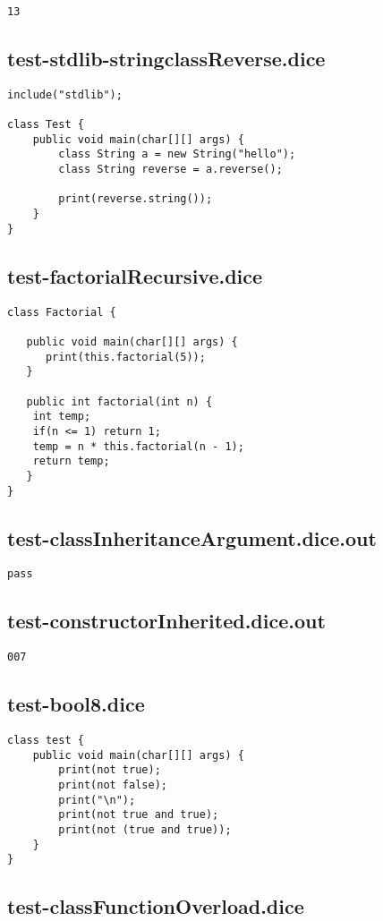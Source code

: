 \begin{verbatim}
13
\end{verbatim}\pagebreak\subsection{test-stdlib-stringclassReverse.dice}
\begin{verbatim}
include("stdlib");

class Test {
    public void main(char[][] args) {
        class String a = new String("hello");
        class String reverse = a.reverse();

        print(reverse.string());
    }   
}

\end{verbatim}\pagebreak\subsection{test-factorialRecursive.dice}
\begin{verbatim}
class Factorial {

   public void main(char[][] args) {
      print(this.factorial(5));
   }

   public int factorial(int n) {
    int temp;
    if(n <= 1) return 1;
    temp = n * this.factorial(n - 1);
    return temp;
   }
}

\end{verbatim}\pagebreak\subsection{test-classInheritanceArgument.dice.out}
\begin{verbatim}
pass
\end{verbatim}\pagebreak\subsection{test-constructorInherited.dice.out}
\begin{verbatim}
007
\end{verbatim}\pagebreak\subsection{test-bool8.dice}
\begin{verbatim}
class test {
	public void main(char[][] args) {
		print(not true);
		print(not false);
		print("\n");
		print(not true and true);
		print(not (true and true));
	}
}
\end{verbatim}\pagebreak\subsection{test-classFunctionOverload.dice}
